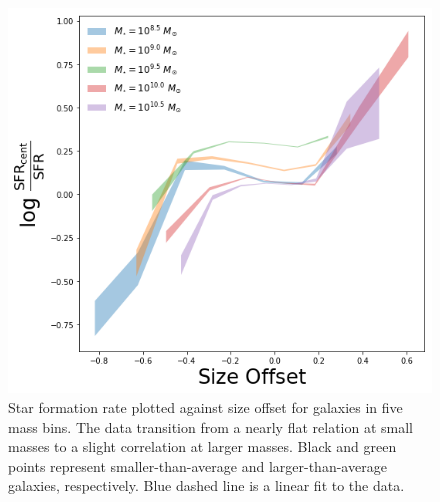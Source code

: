 \documentclass[iop]{emulateapj}
\begin{document}

\begin{figure}
	\centering
	\includegraphics[width=1.5 \columnwidth]{excess.png}
	\caption{Star formation rate plotted against size offset for galaxies in five mass bins. The data transition from a nearly flat relation at small masses to a slight correlation at larger masses. Black and green points represent smaller-than-average and larger-than-average galaxies, respectively. Blue dashed line is a linear fit to the data.}
	\label{fig:sfr_ex}
	
\end{figure}
\end{document}
